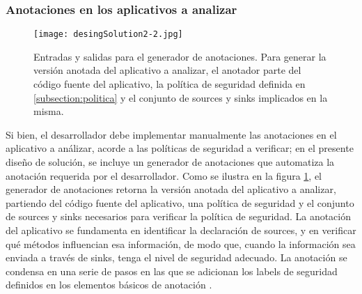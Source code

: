 \subsubsection{Anotaciones en los aplicativos a analizar}
\label{subsec:anotador}
\begin{figure}[t!]
	\begin{center}
	\texttt{[image: desingSolution2-2.jpg]}
	\end{center}
	\caption{Entradas y salidas para el generador de anotaciones.\newline
	Para generar la versión anotada del aplicativo a analizar, el anotador parte
	del código fuente del aplicativo, la política de seguridad definida en
	\ref{subsection:politica} y el conjunto de sources y sinks implicados en la misma.}
	\label{fig:desingSolution}
\end{figure}
Si bien, el desarrollador debe implementar manualmente las anotaciones en el
aplicativo a análizar, acorde a las políticas de seguridad a verificar; en el
presente diseño de solución, se incluye un generador de anotaciones que
automatiza la anotación requerida por el desarrollador. Como se ilustra en la
figura \ref{fig:desingSolution}, el generador de anotaciones retorna la versión
anotada del aplicativo a analizar, partiendo del código fuente del aplicativo,
una política de seguridad y el conjunto de sources y sinks necesarios para
verificar la política de seguridad.\newline
La anotación del aplicativo se fundamenta en identificar la declaración de
sources, y en verificar qué métodos influencian esa información, de modo que,
cuando la información sea enviada a través de sinks, tenga el nivel de seguridad
adecuado. La anotación se condensa en una serie de pasos en las que se adicionan
los labels de seguridad definidos en los elementos básicos de anotación
\label{subsec:elements}.












